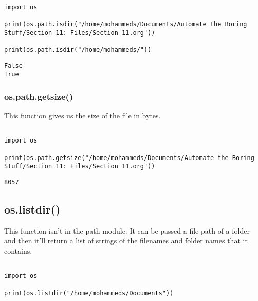 \documentclass[11pt]{article}
\begin{document}
\begin{verbatim}

import os

print(os.path.isdir("/home/mohammeds/Documents/Automate the Boring Stuff/Section 11: Files/Section 11.org"))

print(os.path.isdir("/home/mohammeds/"))

\end{verbatim}

\begin{verbatim}
False
True
\end{verbatim}

\subsubsection{os.path.getsize()}
\label{sec:orgad74db1}

This function gives us the size of the file in bytes.

\begin{verbatim}

import os

print(os.path.getsize("/home/mohammeds/Documents/Automate the Boring Stuff/Section 11: Files/Section 11.org"))

\end{verbatim}

\begin{verbatim}
8057
\end{verbatim}

\subsection{os.listdir()}
\label{sec:org00cc324}

This function isn't in the path module. It can be passed a file path of a folder and then it'll return a list of strings of the filenames and folder names that it contains.

\begin{verbatim}

import os

print(os.listdir("/home/mohammeds/Documents"))

\end{verbatim}
\end{document}
